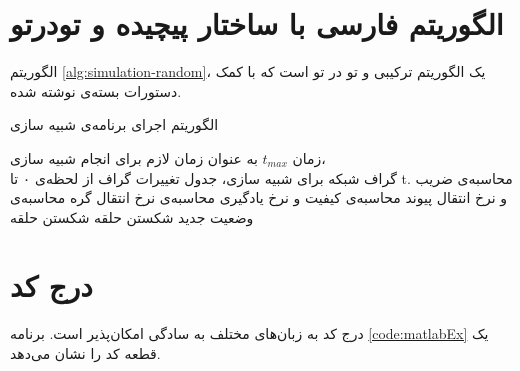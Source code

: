 \section{الگوریتم فارسی با ساختار پیچیده و تودرتو}
الگوریتم \ref{alg:simulation-random}، یک الگوریتم ترکیبی و تو در تو است که با کمک دستورات بسته‌ی  نوشته شده.

\begin{algorithm}[ht]
	\onehalfspacing
	\caption{الگوریتم اجرای برنامه‌ی شبیه سازی}
	\label{alg:simulation-random}
	\begin{algorithmic}[1]
		\REQUIRE زمان $t_{max}$ به عنوان زمان لازم برای انجام شبیه سازی،\\
		\REQUIRE  گراف شبکه برای شبیه سازی،
		\ENSURE جدول تغییرات گراف از لحظه‌ی ۰ تا t.
				\STATE محاسبه‌ی ضریب و نرخ انتقال پیوند
				\STATE محاسبه‌ی کیفیت و نرخ یادگیری
			\ENDFOR
				\STATE محاسبه‌ی نرخ انتقال گره
				\STATE محاسبه‌ی وضعیت جدید
			\ENDFOR
				\STATE شکستن حلقه
				\STATE شکستن حلقه
			\ENDIF
		\ENDFOR
	\end{algorithmic}
\end{algorithm}

\section{درج کد}
درج کد به زبان‌های مختلف به سادگی امکان‌پذیر است. برنامه
\ref{code:matlabEx}
یک قطعه کد
را نشان می‌دهد.
\singlespacing
\begin{figure}
	\begin{LTR}
		
	\end{LTR}
\end{figure}
\doublespacing

